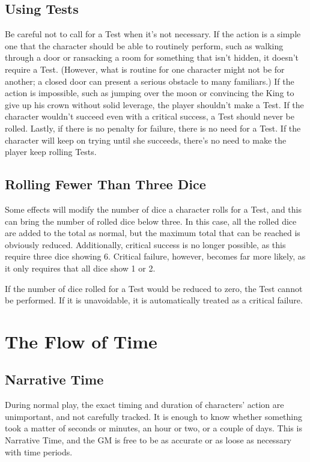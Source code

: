 \subsection{Using Tests}

Be careful not to call for a Test when it's not necessary.
If the action is a simple one that the character should be able to routinely perform, such as walking through a door or ransacking a room for something that isn't hidden, it doesn't require a Test.
(However, what is routine for one character might not be for another; a closed door can present a serious obstacle to many familiars.)
If the action is impossible, such as jumping over the moon or convincing the King to give up his crown without solid leverage, the player shouldn't make a Test.
If the character wouldn't succeed even with a critical success, a Test should never be rolled.
Lastly, if there is no penalty for failure, there is no need for a Test.
If the character will keep on trying until she succeeds, there's no need to make the player keep rolling Tests.

\subsection{Rolling Fewer Than Three Dice}

Some effects will modify the number of dice a character rolls for a Test, and this can bring the number of rolled dice below three.
In this case, all the rolled dice are added to the total as normal, but the maximum total that can be reached is obviously reduced.
Additionally, critical success is no longer possible, as this require three dice showing 6.
Critical failure, however, becomes far more likely, as it only requires that all dice show 1 or 2.

If the number of dice rolled for a Test would be reduced to zero, the Test cannot be performed.
If it is unavoidable, it is automatically treated as a critical failure.

\section{The Flow of Time}

\subsection{Narrative Time}

During normal play, the exact timing and duration of characters' action are unimportant, and not carefully tracked.
It is enough to know whether something took a matter of seconds or minutes, an hour or two, or a couple of days.
This is Narrative Time, and the GM is free to be as accurate or as loose as necessary with time periods.

